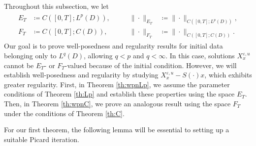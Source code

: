 \documentclass{amsart}
\theoremstyle{plain}
\theoremstyle{remark}
\theoremstyle{plain}
\numberwithin{equation}{section}
\newcommand{\ceqq}{\coloneqq}
\newcommand{\eps}{\varepsilon}
\begin{document}
Throughout this subsection, we let 
\begin{align}\label{eq:defE_TF_T}
\begin{alignedat}{2}
E_T &\ceqq C([0,T];L^p(D)), 
&\qquad \|\cdot\|_{E_T} &\ceqq \|\cdot\|_{C([0,T];L^p(D))},\\
F_T &\ceqq C([0,T];C(D)),
&\qquad \|\cdot\|_{F_T} &\ceqq \|\cdot\|_{C([0,T];C(D))}.
\end{alignedat}
\end{align}
Our goal is to prove well-posedness and regularity results for initial data belonging only to $L^q(D)$, allowing $q<p$ and $q<\infty$. In this case, solutions $X_x^{\eps,u}$ cannot be $E_T$- or $F_T$-valued because of the initial condition. 
However, we will establish well-posedness and regularity by studying $X_x^{\eps,u}-S(\cdot)x$, which exhibits greater regularity.
First, in Theorem \ref{th:wpnLp}, we assume the parameter conditions of Theorem \ref{th:Lp} and establish these properties using the space $E_T$. Then, in Theorem \ref{th:wpnC}, we prove an analogous result using the space $F_T$ under the conditions of Theorem \ref{th:C}. 

For our first theorem, the following lemma will be essential to setting up a suitable Picard iteration. 
  
\end{document}
